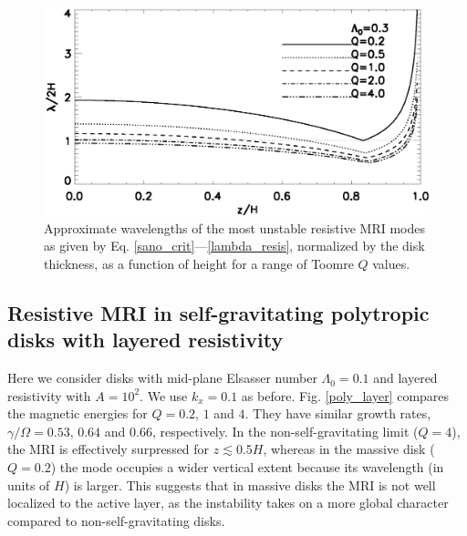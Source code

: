 



\begin{figure}
  \includegraphics[width=\linewidth]{figures/lambda_poly_uniresis}
  \caption{Approximate wavelengths of the most unstable resistive MRI modes as given by
    Eq. \ref{sano_crit}---\ref{lambda_resis}, normalized by the 
    disk thickness, as a function of height for a range of Toomre $Q$
    values.  
    \label{lambda_poly_resis}}
\end{figure}


\subsection{Resistive MRI in self-gravitating polytropic disks with layered
  resistivity} 
Here we consider disks with mid-plane Elsasser number $\Lambda_0=0.1$
and layered resistivity with $A=10^2$. We use $k_x=0.1$ as before.  
Fig. \ref{poly_layer} compares the magnetic 
energies for $Q=0.2,\,1$ and $4$. They have similar growth rates, $\gamma/\Omega
= 0.53,\,0.64$ and $0.66$, respectively. In the non-self-gravitating
limit ($Q=4$), the MRI is effectively surpressed for $z\lesssim0.5H$, whereas
in the massive disk ($Q=0.2$) the mode occupies a wider vertical
extent because its wavelength (in units of $H$) is larger. This
suggests that in massive disks the MRI is not well localized to the
active layer, as the instability takes on a more global character
compared to non-self-gravitating disks.        

